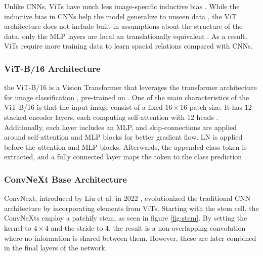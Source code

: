 Unlike CNNs, ViTs have much less image-specific inductive bias \cite{dosovitskiy2021imageworth16x16words}. While the inductive bias in CNNs help the model generalize to unseen data \cite{kim2020inductivebias}, the ViT architecture does not include built-in assumptions about the structure of the data, only the MLP layers are local an translationally equivalent \cite{dosovitskiy2021imageworth16x16words}. As a result, ViTs require more training data to learn spacial relations compared with CNNs.



\subsubsection{ViT-B/16 Architecture}
\label{sec:vitb16}
the ViT-B/16 is a Vision Transformer that leverages the transformer architecture for image classification \cite{dosovitskiy2021imageworth16x16words}, pre-trained on . One of the main characteristics of the ViT-B/16 is that the input image consist of a fixed $16 \times 16$ patch size. It has 12 stacked encoder layers, each computing self-attention with 12 heads \cite{dosovitskiy2021imageworth16x16words}. Additionally, each layer includes an MLP, and skip-connections are applied around self-attention and MLP blocks for better gradient flow. LN is applied before the attention and MLP blocks. Afterwards, the appended class token is extracted, and a fully connected layer maps the token to the class prediction \cite{torchvision2024vitb16}. 



\subsubsection{ConvNeXt Base Architecture}
\label{sec:convnext}
ConvNext, introduced by Liu et al. in 2022 \cite{liu2022convnet2020s}, evolutionized the traditional CNN architecture by incorporating elements from ViTs. Starting with the stem cell, the ConvNeXts employ a patchify stem, as seen in figure \ref{fig:stem}. By setting the kernel to $4 \times 4$ and the stride to 4, the result is a non-overlapping convolution where no information is shared between them. However, these are later combined in the final layers of the network.  

